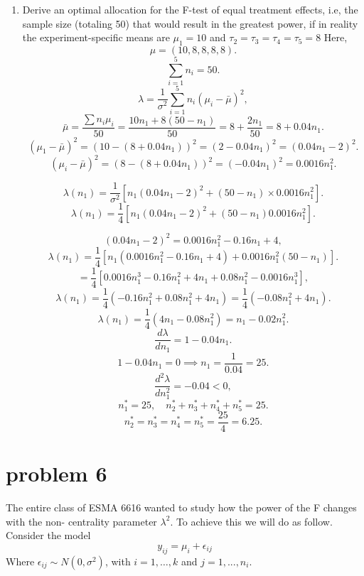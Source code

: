 \documentclass{article}
\begin{document}
\begin{enumerate}
	\item Derive an optimal allocation for the F-test of equal treatment effects, i.e, the sample size
	      (totaling 50) that would result in the greatest power, if in reality the experiment-specific means are
	      $\mu_1=10$ and $\tau_2 = \tau_3 = \tau_4 = \tau_5 =8$
	      Here,
	      \[
		      \mu = (10, 8, 8, 8, 8).
	      \]
	      \[
		      \sum_{i=1}^5 n_i = 50.
	      \]
	      \[
		      \lambda = \frac{1}{\sigma^2} \sum_{i=1}^5 n_i (\mu_i - \bar{\mu})^2,
	      \]
	      \[
		      \bar{\mu} = \frac{\sum n_i \mu_i}{50} = \frac{10 n_1 + 8 (50 - n_1)}{50} = 8 + \frac{2 n_1}{50} = 8 + 0.04 n_1.
	      \]
	      \[
		      (\mu_1 - \bar{\mu})^2 = (10 - (8 + 0.04 n_1))^2 = (2 - 0.04 n_1)^2 = (0.04 n_1 - 2)^2.
	      \]
	      \[
		      (\mu_i - \bar{\mu})^2 = (8 - (8 + 0.04 n_1))^2 = ( -0.04 n_1)^2 = 0.0016 n_1^2.
	      \]

	      \[
		      \lambda(n_1) = \frac{1}{\sigma^2} \left[ n_1 (0.04 n_1 - 2)^2 + (50 - n_1) \times 0.0016 n_1^2 \right].
	      \]
	      \[
		      \lambda(n_1) = \frac{1}{4} \left[ n_1 (0.04 n_1 - 2)^2 + (50 - n_1) 0.0016 n_1^2 \right].
	      \]

	      \[
		      (0.04 n_1 - 2)^2 = 0.0016 n_1^2 - 0.16 n_1 + 4,
	      \]
	      \[
		      \lambda(n_1) = \frac{1}{4} \left[ n_1 (0.0016 n_1^2 - 0.16 n_1 + 4) + 0.0016 n_1^2 (50 - n_1) \right].
	      \]
	      \[
		      = \frac{1}{4} \left[0.0016 n_1^3 - 0.16 n_1^2 + 4 n_1 + 0.08 n_1^2 - 0.0016 n_1^3 \right],
	      \]
	      \[
		      \lambda(n_1) = \frac{1}{4} \left(-0.16 n_1^2 + 0.08 n_1^2 + 4 n_1\right) = \frac{1}{4} \left(-0.08 n_1^2 + 4 n_1\right).
	      \]
	      \[
		      \lambda(n_1) = \frac{1}{4} \left(4 n_1 - 0.08 n_1^2 \right) = n_1 - 0.02 n_1^2.
	      \]
	      \[
		      \frac{d\lambda}{dn_1} = 1 - 0.04 n_1.
	      \]
	      \[
		      1 - 0.04 n_1 = 0 \implies n_1 = \frac{1}{0.04} = 25.
	      \]
	      \[
		      \frac{d^2\lambda}{dn_1^2} = -0.04 < 0,
	      \]
	      \[
		      n_1^* = 25, \quad n_2^* + n_3^* + n_4^* + n_5^* = 25.
	      \]
	      \[
		      n_2^* = n_3^* = n_4^* = n_5^* = \frac{25}{4} = 6.25.
	      \]
\end{enumerate}

\section{problem 6}
The entire class of ESMA 6616 wanted to study how the power of the F changes with the non-
centrality parameter $\lambda^2$. To achieve this we will do as follow. Consider the model
$$
	y_{ij} = \mu_i + \epsilon_{ij}
$$
Where $\epsilon_{ij}\sim N(0,\sigma^2)$, with $i=1,\ldots,k$ and $j=1,...,n_i$.
\end{document}
